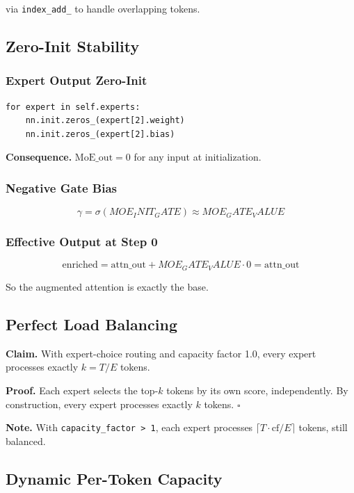 via \texttt{index\_add\_} to handle overlapping tokens.

\subsection{Zero-Init Stability}

\subsubsection{Expert Output Zero-Init}

\begin{lstlisting}
for expert in self.experts:
    nn.init.zeros_(expert[2].weight)
    nn.init.zeros_(expert[2].bias)
\end{lstlisting}

\textbf{Consequence.} $\text{MoE\_out} = 0$ for any input at initialization.

\subsubsection{Negative Gate Bias}

\[
\gamma = \sigma({{MOE_INIT_GATE}}) \approx {{MOE_GATE_VALUE}}
\tag{4.13}
\]

\subsubsection{Effective Output at Step 0}

\[
\text{enriched} = \text{attn\_out} + {{MOE_GATE_VALUE}} \cdot 0 = \text{attn\_out}
\tag{4.14}
\]

So the augmented attention is exactly the base.

\subsection{Perfect Load Balancing}

\textbf{Claim.} With expert-choice routing and capacity factor 1.0, every expert 
processes exactly $k = T / E$ tokens.

\textbf{Proof.} Each expert selects the top-$k$ tokens by its own score, 
independently. By construction, every expert processes exactly $k$ tokens. 
$\square$

\textbf{Note.} With \texttt{capacity\_factor > 1}, each expert processes $\lceil T \cdot 
\text{cf} / E \rceil$ tokens, still balanced.

\subsection{Dynamic Per-Token Capacity}

